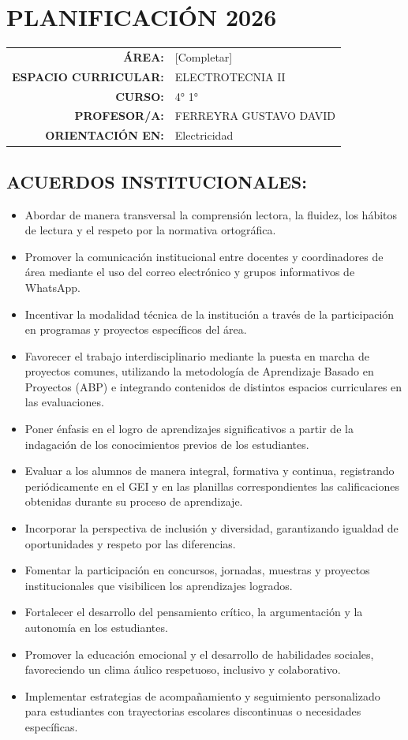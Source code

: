 \documentclass[../main.tex]{subfiles}
\begin{document}
\section*{\centering PLANIFICACIÓN 2026}

\begin{tabular}{r l}
	\textbf{ÁREA:}               & [Completar]            \\
	\textbf{ESPACIO CURRICULAR:} & ELECTROTECNIA II       \\
	\textbf{CURSO:}              & 4° 1°                  \\
	\textbf{PROFESOR/A:}         & FERREYRA GUSTAVO DAVID \\
	\textbf{ORIENTACIÓN EN:}     & Electricidad
\end{tabular}

\subsection*{ACUERDOS INSTITUCIONALES:}
\begin{itemize}[itemsep=1pt]
	\item Abordar de manera transversal la comprensión lectora, la fluidez, los hábitos de lectura y el respeto por la normativa ortográfica.
	\item Promover la comunicación institucional entre docentes y coordinadores de área mediante el uso del correo electrónico y grupos informativos de WhatsApp.
	\item Incentivar la modalidad técnica de la institución a través de la participación en programas y proyectos específicos del área.
	\item Favorecer el trabajo interdisciplinario mediante la puesta en marcha de proyectos comunes, utilizando la metodología de Aprendizaje Basado en Proyectos (ABP) e integrando contenidos de distintos espacios curriculares en las evaluaciones.
	\item Poner énfasis en el logro de aprendizajes significativos a partir de la indagación de los conocimientos previos de los estudiantes.
	\item Evaluar a los alumnos de manera integral, formativa y continua, registrando periódicamente en el GEI y en las planillas correspondientes las calificaciones obtenidas durante su proceso de aprendizaje.
	\item Incorporar la perspectiva de inclusión y diversidad, garantizando igualdad de oportunidades y respeto por las diferencias.
	\item Fomentar la participación en concursos, jornadas, muestras y proyectos institucionales que visibilicen los aprendizajes logrados.
	\item Fortalecer el desarrollo del pensamiento crítico, la argumentación y la autonomía en los estudiantes.
	\item Promover la educación emocional y el desarrollo de habilidades sociales, favoreciendo un clima áulico respetuoso, inclusivo y colaborativo.
	\item Implementar estrategias de acompañamiento y seguimiento personalizado para estudiantes con trayectorias escolares discontinuas o necesidades específicas.
\end{itemize}
\end{document}
